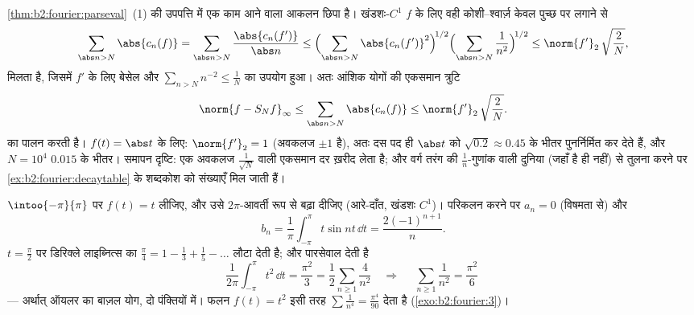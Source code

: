 \begin{example}[$C^1$ पुच्छ-परिबंध, परिमाणात्मक रूप में]\label{ex:b2:fourier:tailbound}
\cref{thm:b2:fourier:parseval}~(1) की उपपत्ति में एक काम आने वाला आकलन छिपा है।  खंडशः-$C^1$ $f$
के लिए वही कोशी--श्वार्ज़ केवल पुच्छ पर लगाने से
\[
\sum_{\abs n > N}\abs{c_n(f)}
= \sum_{\abs n > N}\frac{\abs{c_n(f')}}{\abs n}
\leq \Bigl(\sum_{\abs n > N}\abs{c_n(f')}^2\Bigr)^{\!1/2}
\Bigl(\sum_{\abs n>N}\frac{1}{n^2}\Bigr)^{\!1/2}
\leq \norm{f'}_2\,\sqrt{\frac{2}{N}} ,
\]
मिलता है, जिसमें $f'$ के लिए बेसेल और $\sum_{n>N}n^{-2} \leq \frac1N$ का उपयोग हुआ। अतः आंशिक योगों की
एकसमान त्रुटि
\[
\norm{f - S_Nf}_\infty
\leq \sum_{\abs n>N}\abs{c_n(f)}
\leq \norm{f'}_2\,\sqrt{\frac2N} .
\]
का पालन करती है। $f(t) = \abs t$ के लिए: $\norm{f'}_2 = 1$ (अवकलज $\pm1$ है), अतः दस पद ही $\abs t$ को
 $\sqrt{0.2} \approx 0.45$ के भीतर पुनर्निर्मित कर देते हैं, और $N = 10^4$ $0.015$ के
भीतर। समापन दृष्टि: एक अवकलज $\frac{1}{\sqrt N}$ वाली एकसमान दर ख़रीद लेता है; और वर्ग
तरंग की $\frac1n$-गुणांक वाली दुनिया (जहाँ  है ही नहीं) से तुलना
करने पर \cref{ex:b2:fourier:decaytable} के शब्दकोश को संख्याएँ मिल जाती हैं।
\end{example}

\begin{example}[बाज़ल और साथी]\label{ex:b2:fourier:basel}
$\intoo{-\pi}{\pi}$ पर $f(t) = t$ लीजिए, और उसे $2\pi$-आवर्ती रूप से बढ़ा दीजिए (आरे-दाँत, खंडशः
$C^1$)। परिकलन करने पर $a_n = 0$ (विषमता से) और
\[
b_n = \frac{1}{\pi}\int_{-\pi}^{\pi} t\sin nt\,\dd t
= \frac{2(-1)^{n+1}}{n} .
\]
$t = \frac\pi2$ पर डिरिक्ले लाइब्नित्स का $\frac\pi4 = 1 -
\frac13 + \frac15 - \dots$ लौटा देती है; और पारसेवाल देती है
\[
\frac{1}{2\pi}\int_{-\pi}^{\pi} t^2\,\dd t = \frac{\pi^2}{3}
= \frac12\sum_{n\geq1}\frac{4}{n^2}
\quad\Longrightarrow\quad
\boxed{\;\sum_{n\geq1}\frac{1}{n^2} = \frac{\pi^2}{6}\;}
\]
--- अर्थात् ऑयलर का बाज़ल योग, दो पंक्तियों में। फलन $f(t) = t^2$ इसी तरह $\sum \frac1{n^4} = \frac{\pi^4}{90}$
देता है (\cref{exo:b2:fourier:3})।
\end{example}

